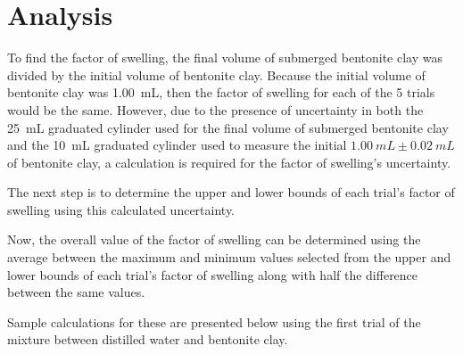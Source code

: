 \documentclass[11pt, letterpaper]{article}
\begin{document}
\section{Analysis}

To find the factor of swelling, the final volume of submerged
bentonite clay was divided by the initial volume of bentonite clay.
Because the initial volume of bentonite clay was \SI{1.00}{mL}, then
the factor of swelling for each of the 5 trials would be the same.
However, due to the presence of uncertainty in both the \SI{25}{mL}
graduated cylinder used for the final volume of submerged bentonite clay
and the \SI{10}{mL} graduated cylinder used to measure the initial
\(\SI{1.00}{mL} \pm \SI{0.02}{mL}\) of bentonite clay, a calculation
is required for the factor of swelling's uncertainty.

The next step is to determine the upper and lower bounds of each trial's factor of swelling
using this calculated uncertainty.

Now, the overall value of the factor of swelling can be determined
using the average between the maximum and minimum values selected
from the upper and lower bounds of each trial's factor of swelling
along with half the difference between the same values.

Sample calculations for these are presented below
using the first trial
of the mixture between distilled water and bentonite clay.
\end{document}
